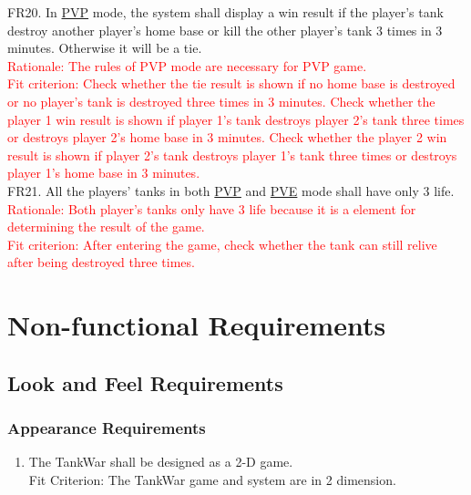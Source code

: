 \documentclass[12pt, titlepage]{article}
\begin{document}
  FR20. In \underline{PVP} mode, the system shall display a win result if the player's tank destroy another player's home base or kill the other player's tank 3 times in 3 minutes. Otherwise it will be a tie.\\
  \textcolor{red}{Rationale: The rules of PVP mode are necessary for PVP game.\\
  Fit criterion: Check whether the tie result is shown if no home base is destroyed or no player's tank is destroyed three times in 3 minutes. Check whether the player 1 win result is shown if player 1's tank destroys player 2's tank three times or destroys player 2's home base in 3 minutes. Check whether the player 2 win result is shown if player 2's tank destroys player 1's tank three times or destroys player 1's home base in 3 minutes.}\\ \newline 
  FR21. All the players' tanks in both \underline{PVP} and \underline{PVE} mode shall have only 3 life.\\
  \textcolor{red}{Rationale: Both player's tanks only have 3 life because it is a element for determining the result of the game.\\
  Fit criterion: After entering the game, check whether the tank can still relive after being destroyed three times.}\\ \newline
  

\section{Non-functional Requirements}

\subsection{Look and Feel Requirements}

\subsubsection{Appearance Requirements}
\label{ssub:appearance_requirements}
\begin{enumerate}[{LF}1. ]
	\item The TankWar shall be designed as a 2-D game.
	\\
	
	Fit Criterion: The TankWar game and system are in 2 dimension.
\end{enumerate}
\end{document}
